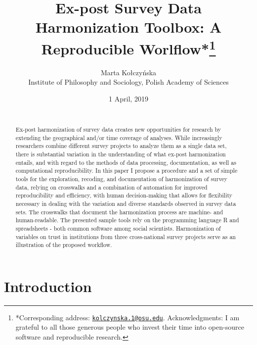 \documentclass[12pt,]{article}
\title{\vspace{1cm}Ex-post Survey Data Harmonization Toolbox: A Reproducible Worlflow*\footnote{*Corresponding address: \href{mailto:kolczynska.1@osu.edu}{\nolinkurl{kolczynska.1@osu.edu}}. Acknowledgments: I am grateful to all those generous people who invest their time into open-source software and reproducible research.}\vspace{0.5cm}\\}
\author{Marta Kołczyńska\\
Institute of Philosophy and Sociology, Polish Academy of Sciences}
\date{1 April, 2019\\
~\\}
\begin{document}
\maketitle
\begin{abstract}
\noindent{}Ex-post harmonization of survey data creates new opportunities for research by extending the geographical and/or time coverage of analyses. While increasingly researchers combine different survey projects to analyze them as a single data set, there is substantial variation in the understanding of what ex-post harmonization entails, and with regard to the methods of data processing, documentation, as well as computational reproducibility. In this paper I propose a procedure and a set of simple tools for the exploration, recoding, and documentation of harmonization of survey data, relying on crosswalks and a combination of automation for improved reproducibility and efficiency, with human decision-making that allows for flexibility necessary in dealing with the variation and diverse standards observed in survey data sets. The crosswalks that document the harmonization process are machine- and human-readable. The presented sample tools rely on the programming language R and spreadsheets - both common software among social scientists. Harmonization of variables on trust in institutions from three cross-national survey projects serve as an illustration of the proposed workflow.\vspace{.8cm}
\end{abstract}

\clearpage

\renewcommand{\baselinestretch}{0.5}\normalsize
\tableofcontents
\renewcommand{\baselinestretch}{1.5}\normalsize

\clearpage

\parindent 0.5in

\hypertarget{introduction}{%
\section{Introduction}\label{introduction}}
\end{document}
